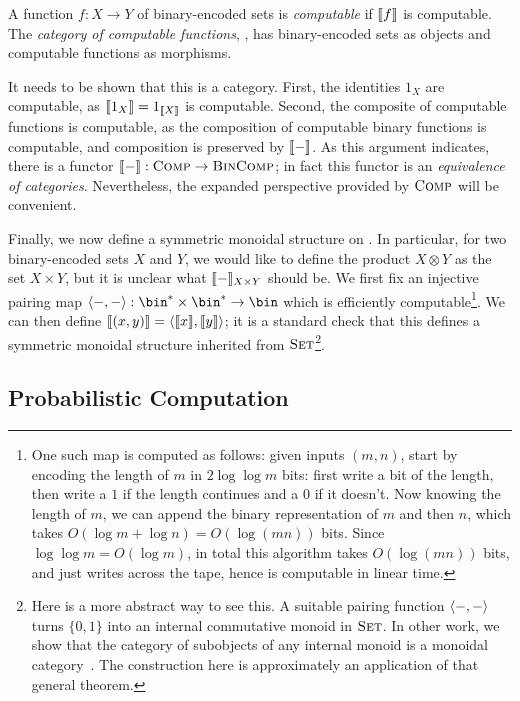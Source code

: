 \begin{dfn}
  A function $f: X\to Y$ of binary-encoded sets is \emph{computable} if
  $\llbracket f \rrbracket$ is computable. The \emph{category of computable functions},
  , has binary-encoded sets as objects and computable functions as
  morphisms.
\end{dfn}

It needs to be shown that this is a category. First, the identities
$1_X$ are computable, as $\llbracket 1_X \rrbracket = 1_{\llbracket X \rrbracket}$ is computable. Second,
the composite of computable functions is computable, as the composition of
computable binary functions is computable, and composition is preserved by
$\llbracket - \rrbracket$. As this argument indicates, there is a functor $\llbracket - \rrbracket:
{\textsc{\text{Comp}}}\to{\textsc{\text{BinComp}}}$; in fact this functor is an \emph{equivalence of
categories}. Nevertheless, the expanded perspective provided by ${\textsc{\text{Comp}}}$ will be
convenient.


Finally, we now define a symmetric monoidal structure on .
In particular, for two binary-encoded sets $X$ and $Y$, we would like to define
the product $X\otimes Y$ as the set $X\times Y$, but it is unclear what
$\llbracket - \rrbracket_{X\times Y}$ should be. We first fix an injective pairing map
$\<-,-\>: \bin^*\times\bin^*\to \bin$ which is efficiently computable\footnote{%
  One such map is computed as follows: given inputs $(m,n)$, start by encoding the
  length of $m$ in $2\log\log m$ bits: first write a bit of the length, then
  write a $1$ if the length continues and a $0$ if it doesn't. Now knowing the
  length of $m$, we can append the binary representation of $m$ and then $n$,
  which takes $O(\log m + \log n) = O(\log (mn))$ bits. Since $\log\log m =
  O(\log m)$, in total this algorithm takes $O(\log(mn))$ bits, and just writes
  across the tape, hence is computable in linear time.
}. We can then define $\llbracket (x, y) \rrbracket = \langle\llbracket x \rrbracket, \llbracket y \rrbracket\rangle$; it is a
standard check that this defines a symmetric monoidal structure inherited from
${\textsc{\text{Set}}}$\footnote{
  Here is a more abstract way to see this. A suitable pairing function $\langle-,-\rangle$
  turns $\{0,1\}$ into an internal commutative monoid in ${\textsc{\text{Set}}}$. In other
  work, we show that the category of subobjects of any internal monoid is a
  monoidal category~\cite{shahar-zdancewic-2024}. The construction here is
  approximately an application of that general theorem.
}.

\subsection{Probabilistic Computation}

